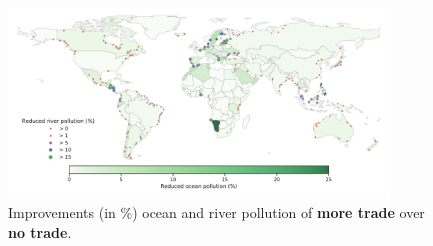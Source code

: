 \documentclass[dvipsnames]{article}
\begin{document}
\begin{figure}[htb!] 
	\centering
		\includegraphics[width=0.9\textwidth]{improvement_w10_per.pdf}
	\caption{\small Improvements (in \%) ocean and river pollution of \textbf{more trade} over \textbf{no trade}.}
	\label{fig:improvement_w10_per}
\end{figure}
\end{document}
